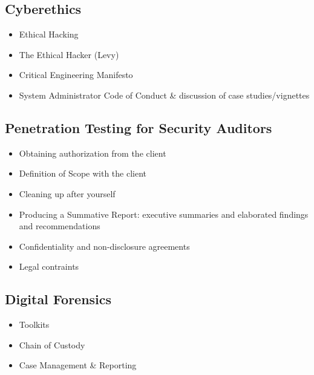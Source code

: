 \documentclass[letterpaper,10pt,english]{sphinxmanual}
\begin{document}
\subsection{Cyberethics}
\label{cybersecurity:cyberethics}\begin{itemize}
\item {} 
Ethical Hacking

\item {} 
The Ethical Hacker (Levy)

\item {} 
Critical Engineering Manifesto

\item {} 
System Administrator Code of Conduct \& discussion of case studies/vignettes

\end{itemize}


\subsection{Penetration Testing for Security Auditors}
\label{cybersecurity:penetration-testing-for-security-auditors}\begin{itemize}
\item {} 
Obtaining authorization from the client

\item {} 
Definition of Scope with the client

\item {} 
Cleaning up after yourself

\item {} 
Producing a Summative Report: executive summaries and elaborated findings and recommendations

\item {} 
Confidentiality and non-disclosure agreements

\item {} 
Legal contraints

\end{itemize}


\subsection{Digital Forensics}
\label{cybersecurity:digital-forensics}\begin{itemize}
\item {} 
Toolkits

\item {} 
Chain of Custody

\item {} 
Case Management \& Reporting

\end{itemize}
\end{document}
